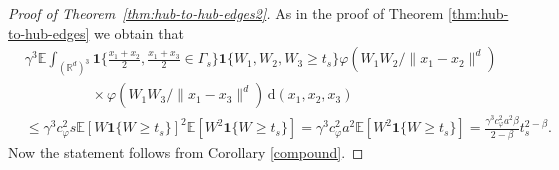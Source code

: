 \documentclass{article}
\theoremstyle{definition}
\numberwithin{equation}{section}
\theoremstyle{remark}
\begin{document}
\begin{proof}[Proof of Theorem~\ref{thm:hub-to-hub-edges2}]
As in the proof of Theorem \ref{thm:hub-to-hub-edges} we obtain that
\begin{align*}
& \gamma^3 \mathbb{E} \int_{(\mathbb{R}^d)^3} \mathbf{1}\bigg\{ \frac{x_1+x_2}{2},\frac{x_1+x_3}{2} \in\Gamma_s \bigg\} \mathbf{1}\{W_1,W_2,W_3\geq t_s\} \varphi(W_1W_2/\|x_1-x_2\|^d) \\
& \hspace{2cm} \times \varphi(W_1W_3/\|x_1-x_3\|^d) \, \mathrm{d}(x_1,x_2,x_3) \\
& \leq \gamma^3 c_\varphi^2 s \mathbb{E}[W\mathbf{1}\{W\geq t_s\}]^2 \mathbb{E}[W^2\mathbf{1}\{W\geq t_s\}] = \gamma^3 c_\varphi^2 a^2 \mathbb{E}[W^2\mathbf{1}\{W\geq t_s\}] = \frac{\gamma^3 c_\varphi^2 a^2 \beta}{2-\beta}t_s^{2-\beta}.
\end{align*}
Now the statement follows from Corollary \ref{compound}.
\end{proof}




%

\end{document}
